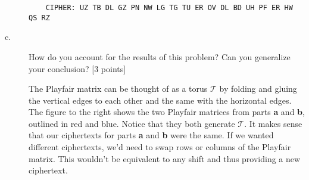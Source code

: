 \documentclass[../hw_sols.tex]{subfiles}
\begin{document}
\begin{description}
\begin{solution}
	\begin{verbatim}
    CIPHER: UZ TB DL GZ PN NW LG TG TU ER OV DL BD UH PF ER HW QS RZ
	\end{verbatim}
\end{solution}


\item[c.] How do you account for the results of this problem? Can you generalize your conclusion? [3 points]

\begin{solution}
\newline
\begin{minipage}{0.55\linewidth}
The Playfair matrix can be thought of as a torus $\mathcal{T}$ by folding and gluing the vertical edges to each other and the same with the horizontal edges. The figure to the right shows the two Playfair matrices from parts \textbf{a} and \textbf{b}, outlined in red and blue. Notice that they both generate $\mathcal{T}$. It makes sense that our ciphertexts for parts \textbf{a} and \textbf{b} were the same. If we wanted different ciphertexts, we'd need to swap rows or columns of the Playfair matrix. This wouldn't be equivalent to any shift and thus providing a new ciphertext.
\end{minipage}
\quad
\begin{minipage}{0.4\linewidth}
\end{minipage}

\end{solution}

\end{description}
\end{document}
